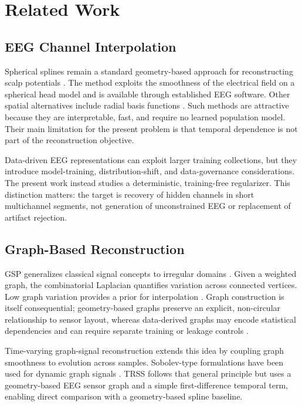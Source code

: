 \section{Related Work}
\subsection{EEG Channel Interpolation}
Spherical splines remain a standard geometry-based approach for reconstructing scalp potentials \cite{perrin1989}. The method exploits the smoothness of the electrical field on a spherical head model and is available through established EEG software. Other spatial alternatives include radial basis functions \cite{jager2016rbf}. Such methods are attractive because they are interpretable, fast, and require no learned population model. Their main limitation for the present problem is that temporal dependence is not part of the reconstruction objective.

Data-driven EEG representations can exploit larger training collections, but they introduce model-training, distribution-shift, and data-governance considerations. The present work instead studies a deterministic, training-free regularizer. This distinction matters: the target is recovery of hidden channels in short multichannel segments, not generation of unconstrained EEG or replacement of artifact rejection.

\subsection{Graph-Based Reconstruction}
GSP generalizes classical signal concepts to irregular domains \cite{shuman2013,ortega2018}. Given a weighted graph, the combinatorial Laplacian quantifies variation across connected vertices. Low graph variation provides a prior for interpolation \cite{narang2013}. Graph construction is itself consequential; geometry-based graphs preserve an explicit, non-circular relationship to sensor layout, whereas data-derived graphs may encode statistical dependencies and can require separate training or leakage controls \cite{kalofolias_how_2016,shekkizhar2020}.

Time-varying graph-signal reconstruction extends this idea by coupling graph smoothness to evolution across samples. Sobolev-type formulations have been used for dynamic graph signals \cite{giraldo2022}. TRSS follows that general principle but uses a geometry-based EEG sensor graph and a simple first-difference temporal term, enabling direct comparison with a geometry-based spline baseline.